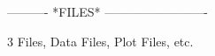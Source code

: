  
 
 
 
 
 
 
 
 
 
 
 
 
 
 
 
 
 
 
 
 
 
 
 
 
 
 
 
 
 
 
 
 
 
 
 
 
 
 
 
 
 
 
 
 
 
 
 
 
 
 
 
 
 
 
 
 
 
 
 
 
 
 
 
 
 
 
 
 
 
----------  *FILES*  -------------------------
 
3
Files, Data Files, Plot Files, etc.
 
 
 
 
 
 
 
 
 
 
 
 
 
 
 
 
 
 
 
 
 
 
 
 
 
 
 
 
 
 
 
 
 
 
 
 
 
 
 
 
 
 
 
